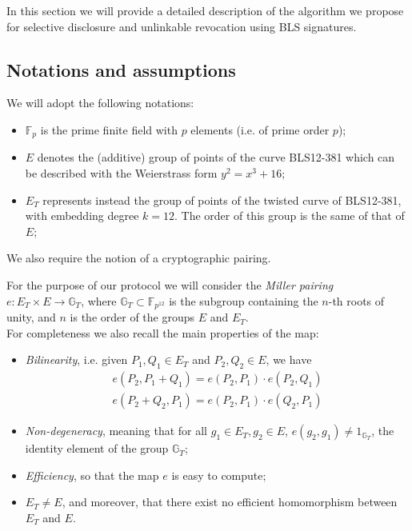 In this section we will provide a detailed description of the
algorithm we propose for selective disclosure and unlinkable
revocation using BLS signatures.

\subsection{Notations and assumptions}

We will adopt the following notations:
\begin{itemize}

\item $\mathbb{F}_p$ is the prime finite field with $p$ elements
  (i.e. of prime order $p$);

\item $E$ denotes the (additive) group of points of the curve
  BLS12-381 \cite{bls381-12} which can be described with the
  Weierstrass form $y^2=x^3 + 16$;

\item $E_T$ represents instead the group of points of the twisted
  curve of BLS12-381, with embedding degree $k=12$. The order of
  this group is the same of that of $E$;

\end{itemize}

We also require the notion of a cryptographic pairing. \cite{weilpair}

For the purpose of our protocol we will consider the \emph{Miller
pairing} $e: E_T \times E\to \mathbb{G}_T$, where $\mathbb{G}_T\subset
\mathbb{F}_{p^{12}}$ is the subgroup containing the $n$-th roots of
unity, and $n$ is the order of the groups $E$ and $E_T$.\\ For
completeness we also recall the main properties of the map:

\begin{itemize}

\item [i.] \emph{Bilinearity}, i.e. given $P_1,Q_1\in E_T$
  and $P_2,Q_2\in E$, we have
  \begin{align*}
    e(P_2,P_1+Q_1) = e(P_2,P_1)\cdot e(P_2,Q_1)   \\
    e(P_2+Q_2,P_1) = e(P_2,P_1)\cdot e(Q_2,P_1)
  \end{align*}

\item[ii.] \emph{Non-degeneracy}, meaning that for all
  $g_1\in E_T, g_2\in E$, $e(g_2,g_1)\ne
  1_{\mathbb{G}_T}$, the identity element of the group
  $\mathbb{G}_T$;

\item[iii.] \emph{ Efficiency}, so that the map $e$ is easy to
  compute;

\item[iv. ] $E_T \ne E$, and moreover, that
  there exist no efficient homomorphism between $E_T$ and
  $E$.

\end{itemize}


